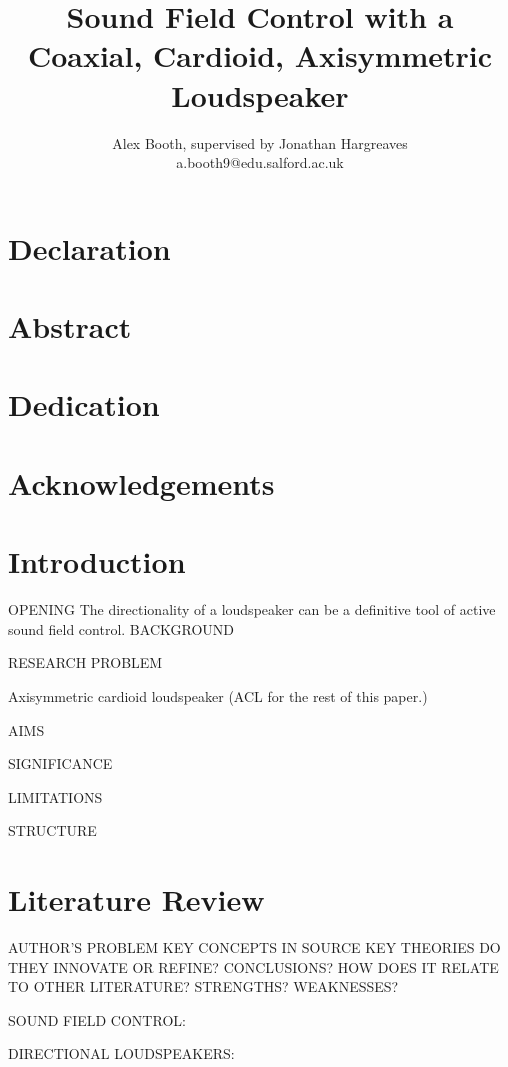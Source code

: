 \documentclass{report}
\title{Sound Field Control with a Coaxial, Cardioid, Axisymmetric Loudspeaker}
\author{Alex Booth, supervised by Jonathan Hargreaves\\ a.booth9@edu.salford.ac.uk}
\begin{document}
\maketitle

\chapter*{Declaration}

\chapter*{Abstract}
    \textit{}

\chapter*{Dedication}



\chapter*{Acknowledgements}

\tableofcontents
\newpage

\chapter{Introduction}
    OPENING
        The directionality of a loudspeaker can be a definitive tool of active sound field control.
    BACKGROUND

    RESEARCH PROBLEM

    Axisymmetric cardioid loudspeaker (ACL for the rest of this paper.)

    AIMS

    SIGNIFICANCE

    LIMITATIONS

    STRUCTURE



\chapter{Literature Review}
    AUTHOR'S PROBLEM
    KEY CONCEPTS IN SOURCE
    KEY THEORIES
    DO THEY INNOVATE OR REFINE?
    CONCLUSIONS?
    HOW DOES IT RELATE TO OTHER LITERATURE?
    STRENGTHS?
    WEAKNESSES?

    SOUND FIELD CONTROL:




    DIRECTIONAL LOUDSPEAKERS:
\end{document}
